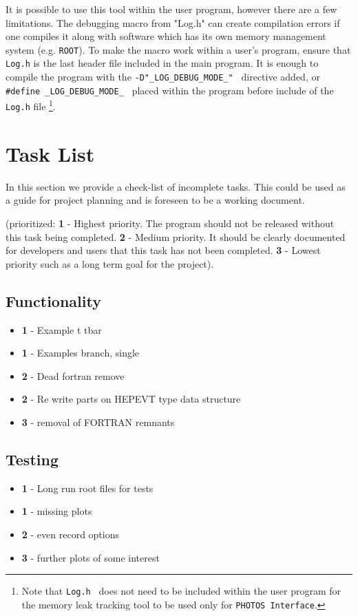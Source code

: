 \documentclass[]{Photos_interface_design}
\begin{document}
It is possible to use this tool within the user program, however there are a few limitations.
The debugging macro from "Log.h" can create compilation errors if one compiles
it along with software which has its own memory management system (e.g. {\tt ROOT}).
To make the macro work within a user's program, ensure that {\tt Log.h} is the last header file
included in the main program.
It is enough to  compile the program with the {\tt -D"\_LOG\_DEBUG\_MODE\_" } directive added,
or {\tt \#define \_LOG\_DEBUG\_MODE\_ } placed within the program before include
of the {\tt Log.h} file%
\footnote{Note that {\tt Log.h } does not need to be included within
the user program  for the memory leak tracking tool to be used only for {\tt PHOTOS Interface}.
}.



\newpage

\section*{Task List}
In this section we provide a check-list of incomplete tasks.
This could be used as a guide for project planning and is foreseen
to be a working document. 

(prioritized: {\bf 1} - Highest priority. The program should not be
released without this task being completed. {\bf 2} - Medium priority.
It should be clearly documented for developers and users that this task has not
been completed. {\bf 3} - Lowest priority such as a long term goal 
for the project).

\subsection*{Functionality}
\begin{itemize}
  \item[\ding{111}]{\bf 1} - Example t tbar
  \item[\ding{111}]{\bf 1} - Examples branch, single
  \item[\ding{111}]{\bf 2} -  Dead fortran remove
  \item[\ding{111}]{\bf 2} -  Re write parts on HEPEVT type data structure
  \item[\ding{111}]{\bf 3} - removal of FORTRAN remnants
\end{itemize}

\subsection*{Testing}
\begin{itemize}
  \item[\ding{111}]{\bf 1} - Long run root files for tests
  \item[\ding{111}]{\bf 1} - missing plots
  \item[\ding{111}]{\bf 2} - even record options
  \item[\ding{111}]{\bf 3} - further plots of some interest
\end{itemize}
\end{document}
